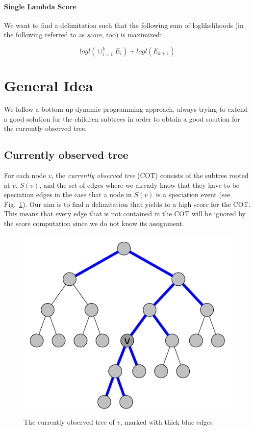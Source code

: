 \documentclass{llncs}
\begin{document}
\paragraph{Single Lambda Score}

We want to find a delimitation such that the following sum of loglikelihoods (in the following referred to as \emph{score}, too) is maximized:

$$logl(\cup_{i=1}^k{E_i}) + logl(E_{k+1})$$

\section{General Idea}

We follow a bottom-up dynamic programming approach, always trying to extend a good solution for the children subtrees in order to obtain a good solution for the currently observed tree.

\subsection{Currently observed tree}

For each node $v$, the \emph{currently observed tree} (COT) consists of the subtree rooted at $v$, $S(v)$, and the set of edges where we already know that they have to be speciation edges in the case that a node in $S(v)$ is a speciation event (see Fig.~\ref{fig:currently_observed_tree}). Our aim is to find a delimitation that yields to a high score for the COT. This means that every edge that is not contained in the COT will be ignored by the score computation since we do not know its assignment.

\begin{figure}[h!]
	\centering
	\includegraphics[scale=0.4]{images/currently_observed_tree.pdf}
	\caption{The currently observed tree of $v$, marked with thick blue edges}
	\label{fig:currently_observed_tree}
\end{figure}
\end{document}
